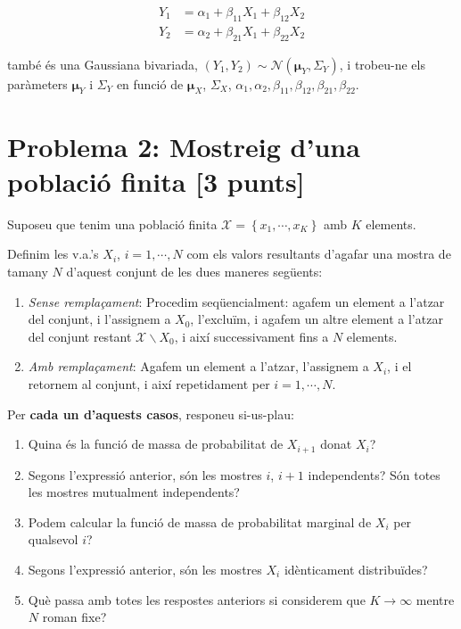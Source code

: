 \documentclass[10pt,a4paper]{article}
\begin{document}
\begin{eqnarray}
Y_1 &= \alpha_1 + \beta_{11} X_1 + \beta_{12} X_2 \\
Y_2 &= \alpha_2 + \beta_{21} X_1 + \beta_{22} X_2 
\end{eqnarray}

també és una Gaussiana bivariada, $(Y_1, Y_2) \sim \mathcal{N}(\mathbf{\mu}_Y, \Sigma_Y)$, i trobeu-ne els paràmeters $\mathbf{\mu}_Y$ i $\Sigma_Y$ en funció de 
$\mathbf{\mu}_X$, $\Sigma_X$, $\alpha_1, \alpha_2, \beta_{11}, \beta_{12}, \beta_{21}, \beta_{22}$.


\section{Problema 2: Mostreig d'una població finita [3 punts]}

Suposeu que tenim una població finita $\mathcal{X}=\left\{x_1, \cdots, x_K\right\}$ amb $K$ elements.

Definim les v.a.'s $X_i$, $i=1, \cdots, N$ com els valors resultants d'agafar una mostra de tamany $N$ d'aquest conjunt de les dues maneres següents:

\begin{enumerate}
\item \emph{Sense remplaçament}: Procedim seqüencialment: agafem un element a l'atzar del conjunt, i l'assignem a $X_0$, l'excluïm, i agafem un altre element a l'atzar del conjunt restant $\mathcal{X} \backslash X_0$, i així successivament fins a $N$ elements.
\item \emph{Amb remplaçament}: Agafem un element a l'atzar, l'assignem a $X_i$, i el retornem al conjunt, i així repetidament per $i=1, \cdots, N$.
\end{enumerate}

Per \textbf{cada un d'aquests casos}, responeu si-us-plau:

\begin{enumerate}
\item Quina és la funció de massa de probabilitat de $X_{i+1}$ donat $X_i$?
\item Segons l'expressió anterior, són les mostres $i$, $i+1$ independents? Són totes les mostres mutualment independents?
\item Podem calcular la funció de massa de probabilitat marginal de $X_i$ per qualsevol $i$? 
\item Segons l'expressió anterior, són les mostres $X_i$ idènticament distribuïdes?
\item Què passa amb totes les respostes anteriors si considerem que $K \to \infty$ mentre $N$ roman fixe?
\end{enumerate}
\end{document}
